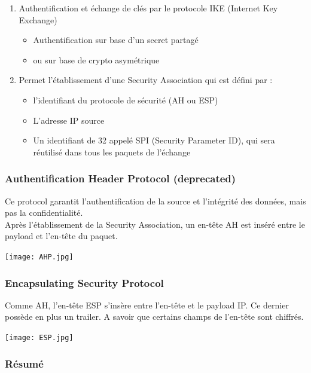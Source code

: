 \documentclass{report}
\begin{document}
    \begin{enumerate}
        \item Authentification et échange de clés par le protocole IKE (Internet Key Exchange)
        \begin{itemize}
            \item Authentification sur base d'un secret partagé
            \item ou sur base de crypto asymétrique
        \end{itemize}

        \item Permet l'établissement d'une Security Association qui est défini par :
        \begin{itemize}
            \item l'identifiant du protocole de sécurité (AH ou ESP)
            \item L'adresse IP source
            \item Un identifiant de 32 appelé SPI (Security Parameter ID), qui sera réutilisé dans tous les paquets de l'échange
        \end{itemize}
    \end{enumerate}

\subsubsection{Authentification Header Protocol (deprecated)}

Ce protocol garantit l'authentification de la source et l'intégrité des données, mais pas la confidentialité.\\ Après l'établissement de la Security Association, un en-tête AH est inséré entre le payload et l'en-tête du paquet.

\texttt{[image: AHP.jpg]}

\subsubsection{Encapsulating Security Protocol}

Comme AH, l'en-tête ESP s'insère entre l'en-tête et le payload IP. Ce dernier possède en plus un trailer. A savoir que certains champs de l'en-tête sont chiffrés.

\texttt{[image: ESP.jpg]}

\subsubsection{Résumé}
\end{document}
